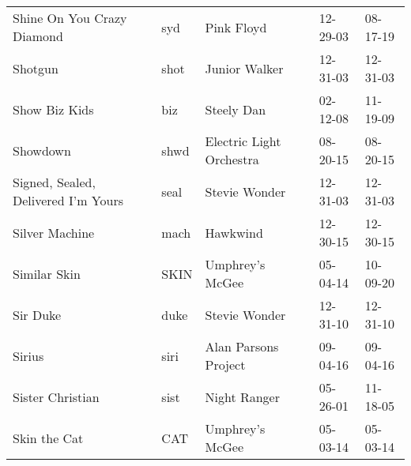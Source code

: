 \begin{longtable}{p{}p{}p{}p{}p{}}
                                              Shine On You Crazy Diamond &           syd &                                               Pink Floyd &              12-29-03 &             08-17-19 \\
                                                                 Shotgun &          shot &                                            Junior Walker &              12-31-03 &             12-31-03 \\
                                                           Show Biz Kids &           biz &                                               Steely Dan &              02-12-08 &             11-19-09 \\
                                                                Showdown &          shwd &                                 Electric Light Orchestra &              08-20-15 &             08-20-15 \\
                                     Signed, Sealed, Delivered I'm Yours &          seal &                                            Stevie Wonder &              12-31-03 &             12-31-03 \\
                                                          Silver Machine &          mach &                                                 Hawkwind &              12-30-15 &             12-30-15 \\
                                                            Similar Skin &          SKIN &                                          Umphrey's McGee &              05-04-14 &             10-09-20 \\
                                                                Sir Duke &          duke &                                            Stevie Wonder &              12-31-10 &             12-31-10 \\
                                                                  Sirius &          siri &                                     Alan Parsons Project &              09-04-16 &             09-04-16 \\
                                                        Sister Christian &          sist &                                             Night Ranger &              05-26-01 &             11-18-05 \\
                                                            Skin the Cat &           CAT &                                          Umphrey's McGee &              05-03-14 &             05-03-14 \\

\end{longtable}

